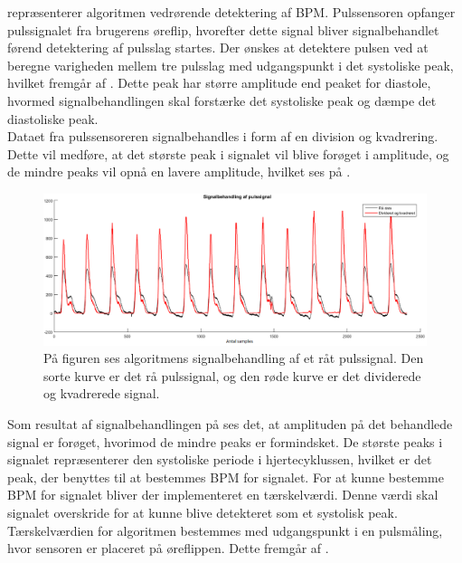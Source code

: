  repræsenterer algoritmen vedrørende detektering af BPM. Pulssensoren opfanger pulssignalet fra brugerens øreflip, hvorefter dette signal bliver signalbehandlet førend detektering af pulsslag startes. Der ønskes at detektere pulsen ved at beregne varigheden mellem tre pulsslag med udgangspunkt i det systoliske peak, hvilket fremgår af . Dette peak har større amplitude end peaket for diastole, hvormed signalbehandlingen skal forstærke det systoliske peak og dæmpe det diastoliske peak.  \\
Dataet fra pulssensoreren signalbehandles i form af en division og kvadrering. Dette vil medføre, at det største peak i signalet vil blive forøget i amplitude, og de mindre peaks vil opnå en lavere amplitude, hvilket ses på . 
\begin{figure}[H]
	\centering
	\includegraphics[scale=0.37]{figures/cDesign/puls_ore_behandlet.png}
	\caption{På figuren ses algoritmens signalbehandling af et råt pulssignal. Den sorte kurve er det rå pulssignal, og den røde kurve er det dividerede og kvadrerede signal.}
	\label{fig:behandlet_puls}
\end{figure}
Som resultat af signalbehandlingen på  ses det, at amplituden på det behandlede signal er forøget, hvorimod de mindre peaks er formindsket. De største peaks i signalet repræsenterer den systoliske periode i hjertecyklussen, hvilket er det peak, der benyttes til at bestemmes BPM for signalet. For at kunne bestemme BPM for signalet bliver der implementeret en tærskelværdi. Denne værdi skal signalet overskride for at kunne blive detekteret som et systolisk peak. Tærskelværdien for algoritmen bestemmes med udgangspunkt i en pulsmåling, hvor sensoren er placeret på øreflippen. Dette fremgår af .
